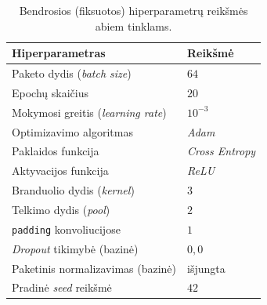 \begin{table}[H]
    \centering
    \caption{Bendrosios (fiksuotos) hiperparametrų reikšmės abiem tinklams.}
    \begin{tabular}{|l|l|}
        \hline
        Hiperparametras & Reikšmė \\
        \hline
        Paketo dydis (\textit{batch size}) & $64$ \\ \hline
        Epochų skaičius & $20$ \\ \hline
        Mokymosi greitis (\textit{learning rate}) & $10^{-3}$ \\ \hline
        Optimizavimo algoritmas & \textit{Adam} \\ \hline
        Paklaidos funkcija & \textit{Cross Entropy} \\ \hline
        Aktyvacijos funkcija & \textit{ReLU} \\ \hline
        Branduolio dydis (\textit{kernel}) & $3$ \\ \hline
        Telkimo dydis (\textit{pool}) & $2$ \\ \hline
        \texttt{padding} konvoliucijose & $1$ \\ \hline
        \textit{Dropout} tikimybė (bazinė) & $0{,}0$ \\ \hline
        Paketinis normalizavimas (bazinė) & išjungta \\ \hline
        Pradinė \textit{seed} reikšmė & $42$ \\ \hline
    \end{tabular}
    \label{tab:hiperparametrai_bendri}
\end{table}
